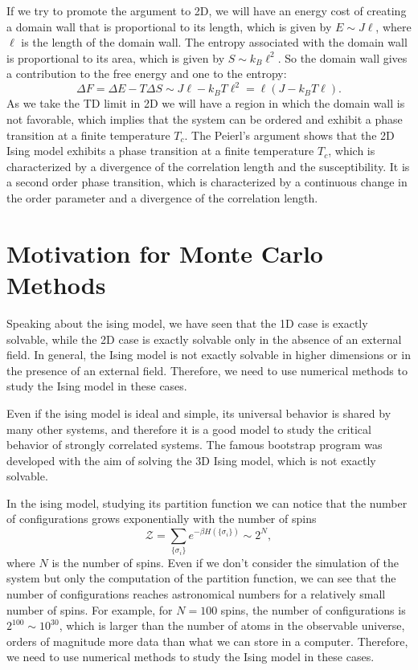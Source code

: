 If we try to promote the argument to 2D, we will have an energy cost of creating a domain wall that is proportional to its length, which is given by \(E \sim J \ell\), where \(\ell\) is the length of the domain wall. The entropy associated with the domain wall is proportional to its area, which is given by \(S \sim k_B \ell^2\). So the domain wall gives a contribution to the free energy and one to the entropy:
\[
    \Delta F = \Delta E - T \Delta S \sim J \ell - k_B T \ell^2 = \ell (J - k_B T \ell).
\]
As we take the TD limit in 2D we will have a region in which the domain wall is not favorable, which implies that the system can be ordered and exhibit a phase transition at a finite temperature \(T_c\). The Peierl's argument shows that the 2D Ising model exhibits a phase transition at a finite temperature \(T_c\), which is characterized by a divergence of the correlation length and the susceptibility. It is a second order phase transition, which is characterized by a continuous change in the order parameter and a divergence of the correlation length.







\section{Motivation for Monte Carlo Methods}

Speaking about the ising model, we have seen that the 1D case is exactly solvable, while the 2D case is exactly solvable only in the absence of an external field. In general, the Ising model is not exactly solvable in higher dimensions or in the presence of an external field. Therefore, we need to use numerical methods to study the Ising model in these cases.

Even if the ising model is ideal and simple, its universal behavior is shared by many other systems, and therefore it is a good model to study the critical behavior of strongly correlated systems. The famous bootstrap program was developed with the aim of solving the 3D Ising model, which is not exactly solvable.

In the ising model, studying its partition function we can notice that the number of configurations grows exponentially with the number of spins
\[
    \mathcal{Z} = \sum_{\{\sigma_i\}} e^{-\beta H(\{\sigma_i\})} \sim 2^N,
\]
where \(N\) is the number of spins. Even if we don't consider the simulation of the system but only the computation of the partition function, we can see that the number of configurations reaches astronomical numbers for a relatively small number of spins. For example, for \(N = 100\) spins, the number of configurations is \(2^{100} \sim 10^{30}\), which is larger than the number of atoms in the observable universe, orders of magnitude more data than what we can store in a computer. Therefore, we need to use numerical methods to study the Ising model in these cases.

